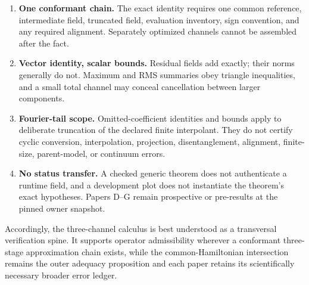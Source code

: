 \begin{enumerate}
  \item \textbf{One conformant chain.}  The exact identity requires one common
        reference, intermediate field, truncated field, evaluation inventory, sign
        convention, and any required alignment.  Separately optimized channels cannot
        be assembled after the fact.
  \item \textbf{Vector identity, scalar bounds.}  Residual fields add exactly; their
        norms generally do not.  Maximum and RMS summaries obey triangle inequalities,
        and a small total channel may conceal cancellation between larger components.
  \item \textbf{Fourier-tail scope.}  Omitted-coefficient identities and bounds apply
        to deliberate truncation of the declared finite interpolant.  They do not
        certify cyclic conversion, interpolation, projection, disentanglement,
        alignment, finite-size, parent-model, or continuum errors.
  \item \textbf{No status transfer.}  A checked generic theorem does not authenticate a
        runtime field, and a development plot does not instantiate the theorem's exact
        hypotheses.  Papers D--G remain prospective or pre-results at the pinned owner
        snapshot.
\end{enumerate}

Accordingly, the three-channel calculus is best understood as a transversal
verification spine.  It supports operator admissibility wherever a conformant
three-stage approximation chain exists, while the common-Hamiltonian intersection
remains the outer adequacy proposition and each paper retains its scientifically
necessary broader error ledger.
